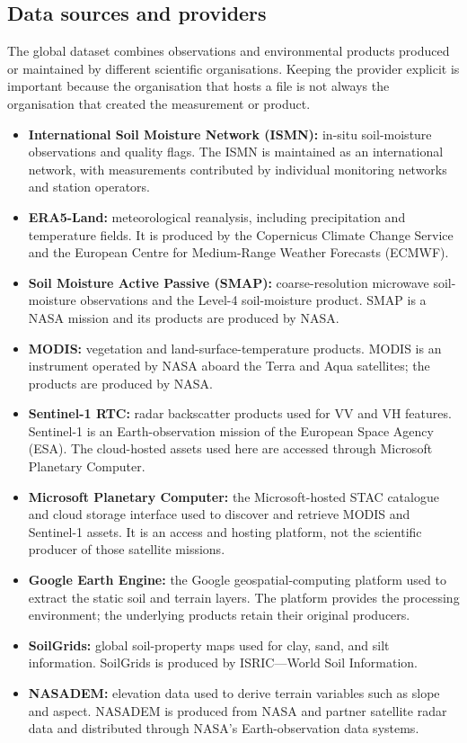 \documentclass[12pt,a4paper]{report}
\begin{document}
\subsection{Data sources and providers}
The global dataset combines observations and environmental products produced
or maintained by different scientific organisations. Keeping the provider
explicit is important because the organisation that hosts a file is not
always the organisation that created the measurement or product.

\begin{itemize}
    \item \textbf{International Soil Moisture Network (ISMN):} in-situ soil-moisture observations and quality flags. The ISMN is maintained as an international network, with measurements contributed by individual monitoring networks and station operators.
    \item \textbf{ERA5-Land:} meteorological reanalysis, including precipitation and temperature fields. It is produced by the Copernicus Climate Change Service and the European Centre for Medium-Range Weather Forecasts (ECMWF).
    \item \textbf{Soil Moisture Active Passive (SMAP):} coarse-resolution microwave soil-moisture observations and the Level-4 soil-moisture product. SMAP is a NASA mission and its products are produced by NASA.
    \item \textbf{MODIS:} vegetation and land-surface-temperature products. MODIS is an instrument operated by NASA aboard the Terra and Aqua satellites; the products are produced by NASA.
    \item \textbf{Sentinel-1 RTC:} radar backscatter products used for VV and VH features. Sentinel-1 is an Earth-observation mission of the European Space Agency (ESA). The cloud-hosted assets used here are accessed through Microsoft Planetary Computer.
    \item \textbf{Microsoft Planetary Computer:} the Microsoft-hosted STAC catalogue and cloud storage interface used to discover and retrieve MODIS and Sentinel-1 assets. It is an access and hosting platform, not the scientific producer of those satellite missions.
    \item \textbf{Google Earth Engine:} the Google geospatial-computing platform used to extract the static soil and terrain layers. The platform provides the processing environment; the underlying products retain their original producers.
    \item \textbf{SoilGrids:} global soil-property maps used for clay, sand, and silt information. SoilGrids is produced by ISRIC---World Soil Information.
    \item \textbf{NASADEM:} elevation data used to derive terrain variables such as slope and aspect. NASADEM is produced from NASA and partner satellite radar data and distributed through NASA's Earth-observation data systems.
\end{itemize}
\end{document}
